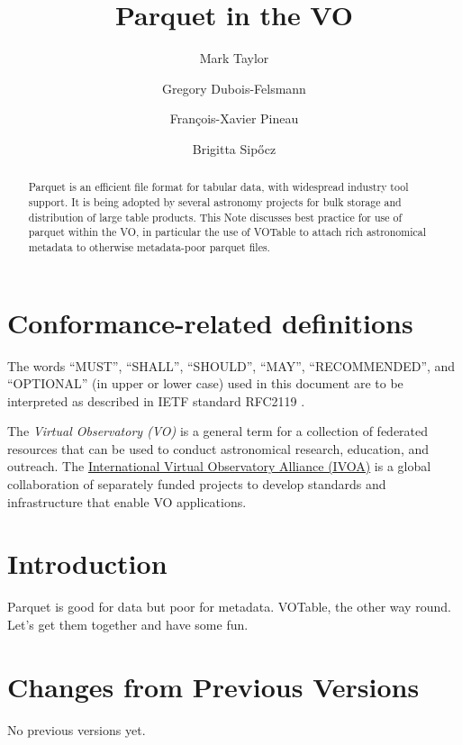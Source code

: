 \documentclass[11pt,a4paper]{ivoa}
\title{Parquet in the VO}
\author[https://wiki.ivoa.net/twiki/bin/view/IVOA/MarkTaylor]
       {Mark Taylor}
\author[https://wiki.ivoa.net/twiki/bin/view/IVOA/GregoryDuboisFelsmann]
       {Gregory Dubois-Felsmann}
\author[https://wiki.ivoa.net/twiki/bin/view/IVOA/FrancoisXavierPineau]
       {Fran\c{c}ois-Xavier Pineau}
\author{Brigitta Sip\H{o}cz}
\begin{document}
\begin{abstract}
Parquet is an efficient file format for tabular data,
with widespread industry tool support.
It is being adopted by several astronomy projects for bulk storage and
distribution of large table products.
This Note discusses best practice for use of parquet within the VO,
in particular the use of VOTable to attach rich astronomical metadata
to otherwise metadata-poor parquet files.
\end{abstract}

\section*{Conformance-related definitions}

The words ``MUST'', ``SHALL'', ``SHOULD'', ``MAY'', ``RECOMMENDED'', and
``OPTIONAL'' (in upper or lower case) used in this document are to be
interpreted as described in IETF standard RFC2119 \citep{std:RFC2119}.

The \emph{Virtual Observatory (VO)} is a
general term for a collection of federated resources that can be used
to conduct astronomical research, education, and outreach.
The \href{https://www.ivoa.net}{International
Virtual Observatory Alliance (IVOA)} is a global
collaboration of separately funded projects to develop standards and
infrastructure that enable VO applications.


\section{Introduction}

Parquet is good for data but poor for metadata.
VOTable, the other way round.
Let's get them together and have some fun.

\appendix
\section{Changes from Previous Versions}

No previous versions yet.


\end{document}
